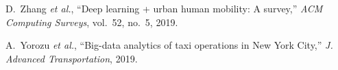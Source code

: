 \documentclass[conference]{IEEEtran}
\begin{document}

\begin{thebibliography}{00}

  D.~Zhang \emph{et al.}, “Deep learning + urban human mobility: A survey,”
  \emph{ACM Computing Surveys}, vol.~52, no.~5, 2019.

  A.~Yorozu \emph{et al.}, “Big-data analytics of taxi operations in New York
  City,” \emph{J. Advanced Transportation}, 2019.


\end{thebibliography}
\end{document}
